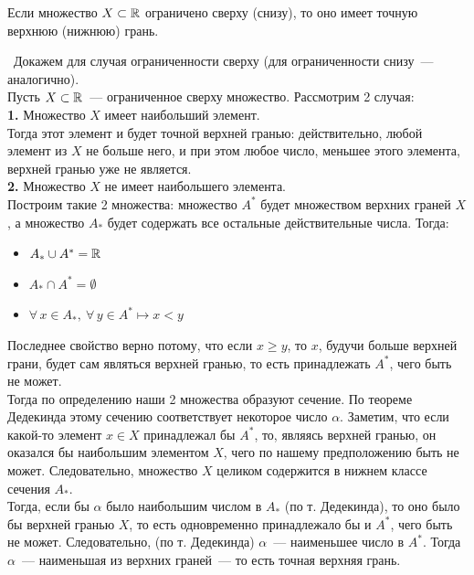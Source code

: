 \begin{theorem} \label{theorem_set_SupInf}
Если множество \(X\subset\mathbb{R}\) ограничено сверху (снизу),
то оно имеет точную верхнюю (нижнюю) грань.

\vspace{2mm}

\proofname~Докажем для случая ограниченности сверху (для ограниченности снизу~--- аналогично). \\
Пусть \(X\subset\mathbb{R}\)~--- ограниченное сверху множество. Рассмотрим 2 случая: \\

\textbf{1.} Множество \(X\) имеет наибольший элемент. \\
Тогда этот элемент и будет точной верхней гранью: действительно,
любой элемент из \(X\) не больше него, и при этом любое число,
меньшее этого элемента, верхней гранью уже не является.\\

\textbf{2.} Множество \(X\) не имеет наибольшего элемента.\\
Построим такие 2 множества: множество \(A^{*}\) будет множеством верхних граней \(X\),
а множество \(A_{*}\) будет содержать все остальные действительные числа. Тогда:

\begin{itemize}
\item \(A_{*} \cup A^{*} = \mathbb{R}\)
\item \(A_{*} \cap A^{*} = \emptyset\)
\item \(\forall\,x\in A_{*},~\forall\,y\in A^{*} \longmapsto x < y\)
\end{itemize}

Последнее свойство верно потому, что если \(x\geq y\), то \(x\),
будучи больше верхней грани, будет сам являться верхней гранью,
то есть принадлежать \(A^{*}\), чего быть не может.\\

Тогда по определению наши 2 множества образуют сечение.
По теореме Дедекинда этому сечению соответствует некоторое число \(\alpha\).
Заметим, что если какой-то элемент \({x\in X}\) принадлежал бы \(A^{*}\),
то, являясь верхней гранью, он оказался бы наибольшим элементом \(X\),
чего по нашему предположению быть не может.
Следовательно, множество \(X\) целиком содержится в нижнем классе сечения \(A_{*}\).\\

Тогда, если бы \(\alpha\) было наибольшим числом в \(A_{*}\) (по т. Дедекинда),
то оно было бы верхней гранью \(X\), то есть одновременно принадлежало бы и \(A^{*}\),
чего быть не может.
Следовательно, (по т. Дедекинда) \(\alpha\)~--- наименьшее число в \(A^{*}\).
Тогда \(\alpha\)~--- наименьшая из верхних граней~--- то есть точная верхняя грань.~\qedsymbol
\end{theorem}

